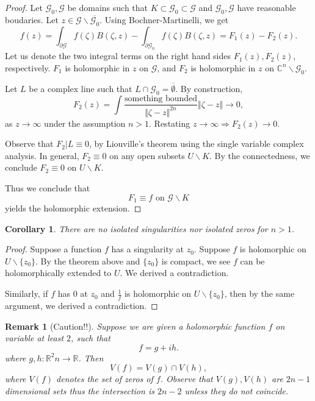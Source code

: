 \documentclass{article}
\newtheorem{remark}{Remark}[section]
\newtheorem{corollary}{Corollary} [section]
\newcommand{\norm}[1]{\Vert #1 \Vert}
\newcommand{\R}[0]{\mathbb{R}}
\newcommand{\C}[0]{\mathbb{C}}
\newcommand{\G}[0]{\mathcal{G}}
\newcommand{\bd}[0]{\partial}
\begin{document}
\begin{proof}
  Let $\G_0,\G$ be domains such that $K\subset \G_0\subset \G$ and $\G_0,\G$ have reasonable boudaries. Let $z\in \G\backslash\overline{\G_0}$. Using Bochner-Martinelli, we get 
  \begin{equation*}
    f(z) = \int_{\bd\G} f(\zeta)B(\zeta,z) - \int_{\bd\G_0}f(\zeta)B(\zeta,z) = F_1(z) - F_2(z).
  \end{equation*}
  Let us denote the two integral terms on the right hand sides $F_1(z),F_2(z)$, respectively.
  $F_1$ is holomorphic in $z$ on $\G$, and $F_2$ is holomorphic in $z$ on $\C^n\backslash\G_0$. 
  \par Let $L$ be a complex line such that $L\cap\G_0=\overline{\emptyset}$. By construction,
  \begin{equation*}
    F_2(z) = \int{\frac {\text{something bounded}} {\norm{\zeta-z}^{2n}}}\norm{\zeta-z}\to 0,
  \end{equation*}
  as $z\to \infty$ under the assumption $n>1$. Restating $z\to\infty\Rightarrow F_2(z)\to0$.
  \par Observe that $F_2|L \equiv 0$, by Liouville's theorem using the single variable complex analysis. In general, $F_2\equiv 0$ on any open subsets $U\backslash K$. 
  By the connectedness, we conclude $F_2\equiv0$ on $U\backslash K$. 
  \par Thus we conclude that 
  \begin{equation*}
    F_1  \equiv f\text{ on } \G\backslash K
  \end{equation*}
  yields the holomorphic extension.
\end{proof}
\begin{corollary}
  There are no isolated singularities nor isolated zeros for $n > 1$.
\end{corollary}
\begin{proof}
  Suppose a function $f$ has a singularity at $z_0$. Suppose $f$ is holomorphic on $U\backslash \{z_0\}$. By the theorem above and $\{z_0\}$ is compact, we see $f$ can be holomorphically extended to $U$. We derived a contradiction.
  \par Similarly, if $f$ has $0$ at $z_0$ and ${\frac 1 f}$ is holomorphic on $U\backslash\{z_0\}$, then by the same argument, we derived a contradiction.
\end{proof}

\begin{remark}[Caution!!]
\par Suppose we are given a holomorphic function $f$ on variable at least $2$, such that 
\begin{equation*}
  f = g+ ih.
\end{equation*}
where $g,h:\R^2n\to\R$. Then 
\begin{equation*}
  V(f) = V(g)\cap V(h),
\end{equation*}
where $V(f)$ denotes the set of zeros of $f$. Observe that $V(g),V(h)$ are $2n-1$ dimensional sets thus the intersection is $2n-2$ unless they do not coincide.
\end{remark}
\end{document}
